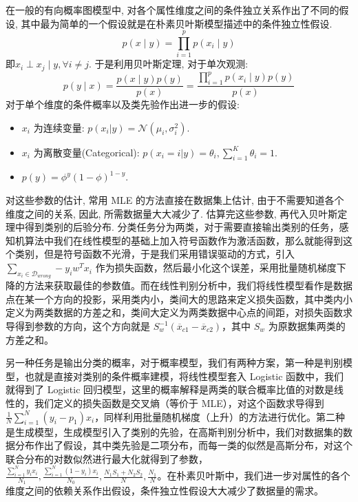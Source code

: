 在一般的有向概率图模型中, 对各个属性维度之间的条件独立关系作出了不同的假设, 其中最为简单的一个假设就是在朴素贝叶斯模型描述中的条件独立性假设. 
\begin{equation}
p(x \mid y)=\prod_{i=1}^{p} p\left(x_{i} \mid y\right)
\end{equation}
即$x_{i} \perp x_{j} \mid y, \forall i \neq j$. 于是利用贝叶斯定理, 对于单次观测:
\begin{equation}
p(y \mid x)=\frac{p(x \mid y) p(y)}{p(x)}=\frac{\prod_{i=1}^{p} p\left(x_{i} \mid y\right) p(y)}{p(x)}
\end{equation}
对于单个维度的条件概率以及类先验作出进一步的假设: 
\begin{itemize}
	\item $x_i$ 为连续变量: $p(x_i|y)=\mathcal{N}(\mu_i,\sigma_i^2)$.
	\item $x_i$ 为离散变量(Categorical): $p(x_i=i|y)=\theta_i,\sum\limits_{i=1}^K\theta_i=1$.
	\item $p(y)=\phi^{y}(1-\phi)^{1-y}$. 
\end{itemize}
\begin{note}
对这些参数的估计, 常用 MLE 的方法直接在数据集上估计, 由于不需要知道各个维度之间的关系, 因此, 所需数据量大大减少了. 估算完这些参数, 再代入贝叶斯定理中得到类别的后验分布.
分类任务分为两类，对于需要直接输出类别的任务，感知机算法中我们在线性模型的基础上加入符号函数作为激活函数，那么就能得到这个类别，但是符号函数不光滑，于是我们采用错误驱动的方式，引入 $\sum\limits_{x_i\in\mathcal{D}_{wrong}}-y_iw^Tx_i$ 作为损失函数，然后最小化这个误差，采用批量随机梯度下降的方法来获取最佳的参数值。而在线性判别分析中，我们将线性模型看作是数据点在某一个方向的投影，采用类内小，类间大的思路来定义损失函数，其中类内小定义为两类数据的方差之和，类间大定义为两类数据中心点的间距，对损失函数求导得到参数的方向，这个方向就是 $S_w^{-1}(\overline x_{c1}-\overline x_{c2})$，其中 $S_w$ 为原数据集两类的方差之和。

另一种任务是输出分类的概率，对于概率模型，我们有两种方案，第一种是判别模型，也就是直接对类别的条件概率建模，将线性模型套入 Logistic 函数中，我们就得到了 Logistic 回归模型，这里的概率解释是两类的联合概率比值的对数是线性的，我们定义的损失函数是交叉熵（等价于 MLE），对这个函数求导得到 $\frac{1}{N}\sum\limits_{i=1}^N(y_i-p_1)x_i$，同样利用批量随机梯度（上升）的方法进行优化。第二种是生成模型，生成模型引入了类别的先验，在高斯判别分析中，我们对数据集的数据分布作出了假设，其中类先验是二项分布，而每一类的似然是高斯分布，对这个联合分布的对数似然进行最大化就得到了参数， $\frac{\sum\limits_{i=1}^Ny_ix_i}{N_1},\frac{\sum\limits_{i=1}^N(1-y_i)x_i}{N_0},\frac{N_1S_1+N_2S_2}{N},\frac{N_1}{N}$。在朴素贝叶斯中，我们进一步对属性的各个维度之间的依赖关系作出假设，条件独立性假设大大减少了数据量的需求。
\end{note}
